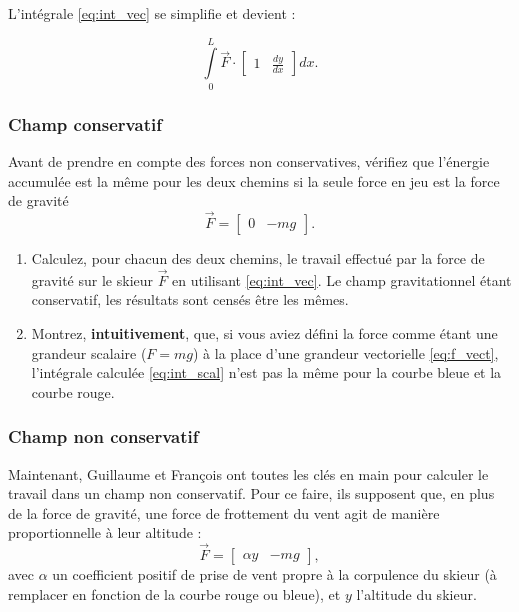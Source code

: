 \documentclass{cup-pan}
\begin{document}
L'intégrale \eqref{eq:int_vec} se simplifie et devient :

\begin{equation}
    \int\limits_0^L \vec{F} \cdot \begin{bmatrix} 1 & \frac{dy}{dx}\end{bmatrix} dx.
\end{equation}


\subsubsection{Champ conservatif}

Avant de prendre en compte des forces non conservatives, vérifiez que l'énergie accumulée est la même pour les deux chemins si la seule force en jeu est la force de gravité
\begin{equation}\label{eq:f_vect}
\vec{F} = \begin{bmatrix} 0 & -m  g\end{bmatrix}.
\end{equation}

\questions
\begin{enumerate}
    \item Calculez, pour chacun des deux chemins, le travail effectué par la force de gravité sur le skieur $\vec{F}$ en utilisant \eqref{eq:int_vec}. Le champ gravitationnel étant conservatif, les résultats sont censés être les mêmes.
    \item Montrez, \textbf{intuitivement}, que, si vous aviez défini la force comme étant une grandeur scalaire ($F = m g$) à la place d'une grandeur vectorielle \eqref{eq:f_vect}, l'intégrale calculée \eqref{eq:int_scal} n'est pas la même pour la courbe bleue et la courbe rouge.
\end{enumerate}

\vspace{\baselineskip}


\subsubsection{Champ non conservatif}

Maintenant, Guillaume et François ont toutes les clés en main pour calculer le travail dans un champ non conservatif. Pour ce faire, ils supposent que, en plus de la force de gravité, une force de frottement du vent agit de manière proportionnelle à leur altitude :
\begin{equation}
     \vec{F} = \begin{bmatrix} \alpha y &-m g \end{bmatrix},
\end{equation}
avec $\alpha$ un coefficient positif de prise de vent propre à la corpulence du skieur (à remplacer en fonction de la courbe rouge ou bleue), et $y$ l'altitude du skieur.
\end{document}

